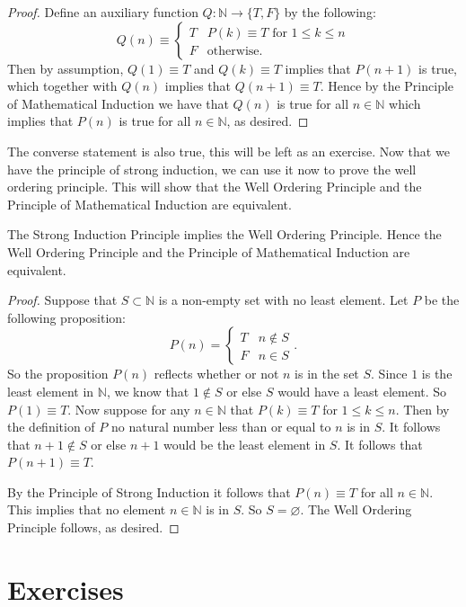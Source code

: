 \begin{proof}
Define an auxiliary function $Q: \mathbb{N} \to \{T, F\}$ by the following:
\[Q(n) \equiv \begin{cases} T & \text{$P(k) \equiv T$ for $1 \leq k \leq n$}\\ F & \text{otherwise.}\end{cases}\]
Then by assumption, $Q(1) \equiv T$ and $Q(k) \equiv T$ implies that $P(n + 1)$ is true, which together with $Q(n)$ implies that $Q(n + 1) \equiv T$. Hence by the Principle of Mathematical Induction we have that $Q(n)$ is true for all $n \in \mathbb{N}$ which implies that $P(n)$ is true for all $n \in \mathbb{N}$, as desired.
\end{proof}

The converse statement is also true, this will be left as an exercise. Now that we have the principle of strong induction, we can use it now to prove the well ordering principle. This will show that the Well Ordering Principle and the Principle of Mathematical Induction are equivalent.

\begin{theorem}
The Strong Induction Principle implies the Well Ordering Principle. Hence the Well Ordering Principle and the Principle of Mathematical Induction are equivalent.
\end{theorem}
\begin{proof}
Suppose that $S \subset \mathbb{N}$ is a non-empty set with no least element. Let $P$ be the following proposition:
\[P(n) = \begin{cases}T & n \not\in S \\ F & n \in S\end{cases}.\]
So the proposition $P(n)$ reflects whether or not $n$ is in the set $S$. Since $1$ is the least element in $\mathbb{N}$, we know that $1 \not\in S$ or else $S$ would have a least element. So $P(1) \equiv T$. Now suppose for any $n \in \mathbb{N}$ that $P(k) \equiv T$ for $1 \leq k \leq n$. Then by the definition of $P$ no natural number less than or equal to $n$ is in $S$. It follows that $n + 1 \not\in S$ or else $n + 1$ would be the least element in $S$. It follows that $P(n + 1) \equiv T$.

By the Principle of Strong Induction it follows that $P(n) \equiv T$ for all $n \in \mathbb{N}$. This implies that no element $n \in \mathbb{N}$ is in $S$. So $S = \varnothing$. The Well Ordering Principle follows, as desired.
\end{proof}

\section{Exercises}
